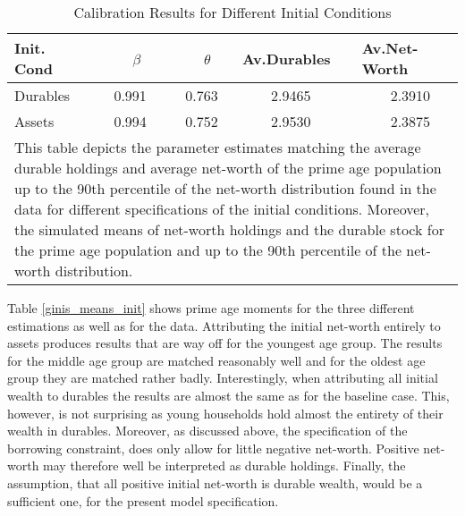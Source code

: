 \documentclass[a4paper,12pt,legno]{article}
\begin{document}
\begin{table}[!htbp]
\centering
\caption{Calibration Results for Different Initial Conditions}
\label{estimates_initial_cond}
\begin{tabular}{llllll}
\hline
\multicolumn{2}{l}{Init. Cond} & \ \ \ \ $\beta$ & \ \ \ \ $\theta$ & Av.Durables & Av.Net-Worth\\ \hline
\multicolumn{2}{l}{Durables}             & \ \ 0.991    & \ \ 0.763  & \ \ \ \ 2.9465 & \ \ \ \ 2.3910      \\
\multicolumn{2}{l}{Assets}            & \ \ 0.994   & \ \ 0.752   & \ \ \ \ 2.9530 & \ \ \ \ 2.3875\\ \bottomrule
\multicolumn{6}{l}{%
  \begin{minipage}{11.5cm}%
    \small This table depicts the parameter estimates matching the average durable holdings and average net-worth of the prime age population up to the 90th percentile of the net-worth distribution found in the data for different specifications of the initial conditions. Moreover, the simulated means of net-worth holdings and the durable stock for the prime age population and up to the 90th percentile of the net-worth distribution.
  \end{minipage}%
}\\    
\end{tabular}
\end{table}

Table \ref{ginis_means_init} shows prime age moments for the three different estimations as well as for the data. Attributing the initial net-worth entirely to assets produces results that are way off for the youngest age group. The results for the middle age group are matched reasonably well and for the oldest age group they are matched rather badly. Interestingly, when attributing all initial wealth to durables the results are almost the same as for the baseline case. This, however, is not surprising as young households hold almost the entirety of their wealth in durables. Moreover, as discussed above, the specification of the borrowing constraint, does only allow for little negative net-worth. Positive net-worth may therefore well be interpreted as durable holdings. Finally, the assumption, that all positive initial net-worth is durable wealth, would be a sufficient one, for the present model specification. 
\end{document}

